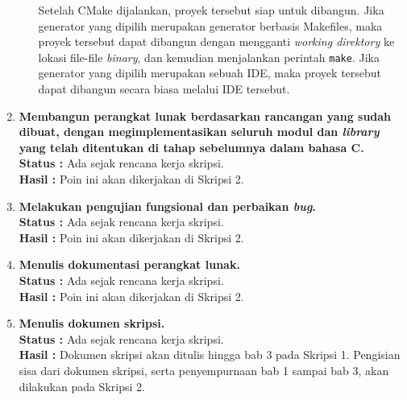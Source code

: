 \documentclass[a4paper,twoside]{article}
\begin{document}
\begin{enumerate}
\begin{enumerate}
\begin{itemize}
	\end{itemize}
	
	Setelah CMake dijalankan, proyek tersebut siap untuk dibangun. Jika generator yang dipilih merupakan generator berbasis Makefiles, maka proyek tersebut dapat dibangun dengan mengganti \textit{working direktory} ke lokasi file-file \textit{binary}, dan kemudian menjalankan perintah \verb|make|. Jika generator yang dipilih merupakan sebuah IDE, maka proyek tersebut dapat dibangun secara biasa melalui IDE tersebut.
\end{enumerate}
		
		\item \textbf{Membangun perangkat lunak berdasarkan rancangan yang sudah dibuat, dengan megimplementasikan seluruh modul dan \textit{library} yang telah ditentukan di tahap sebelumnya dalam bahasa C.}\\
		{\bf Status :} Ada sejak rencana kerja skripsi.\\
		{\bf Hasil :} Poin ini akan dikerjakan di Skripsi 2.

		\item \textbf{Melakukan pengujian fungsional dan perbaikan \textit{bug}.}\\
		{\bf Status :} Ada sejak rencana kerja skripsi.\\
		{\bf Hasil :} Poin ini akan dikerjakan di Skripsi 2.
		

		\item \textbf{Menulis dokumentasi perangkat lunak.}\\
		{\bf Status :} Ada sejak rencana kerja skripsi.\\
		{\bf Hasil :} Poin ini akan dikerjakan di Skripsi 2.

		\item \textbf{Menulis dokumen skripsi.}\\
		{\bf Status :} Ada sejak rencana kerja skripsi.\\
		{\bf Hasil :} Dokumen skripsi akan ditulis hingga bab 3 pada Skripsi 1. Pengisian sisa dari dokumen skripsi, serta penyempurnaan bab 1 sampai bab 3, akan dilakukan pada Skripsi 2.

	\end{enumerate}
\end{document}
